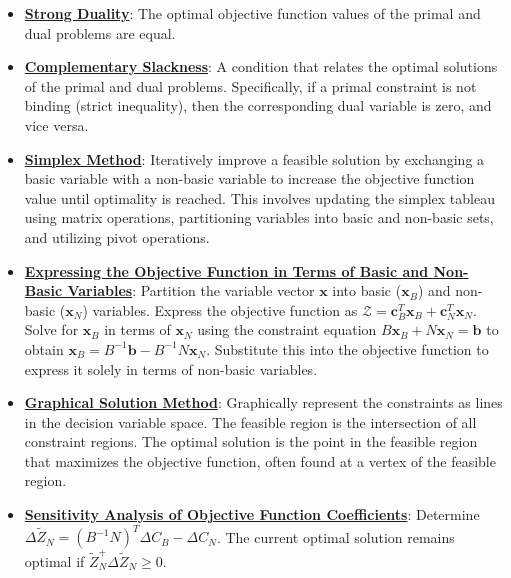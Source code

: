 \documentclass{article}%
\begin{document}
\begin{itemize}[leftmargin=*]
\item \href{https://www.math.purdue.edu/~yipn/421/2024-09-19-DualityExamples.pdf#page=1}{\textbf{Strong Duality}}: The optimal objective function values of the primal and dual problems are equal. %
\item \href{https://www.math.purdue.edu/~yipn/421/2024-09-19-DualityExamples.pdf#page=1}{\textbf{Complementary Slackness}}: A condition that relates the optimal solutions of the primal and dual problems. Specifically, if a primal constraint is not binding (strict inequality), then the corresponding dual variable is zero, and vice versa. %
\item \href{https://www.math.purdue.edu/~yipn/421/2024-09-24-SimplexMatrix.pdf#page=8}{\textbf{Simplex Method}}: Iteratively improve a feasible solution by exchanging a basic variable with a non-basic variable to increase the objective function value until optimality is reached. This involves updating the simplex tableau using matrix operations, partitioning variables into basic and non-basic sets, and utilizing pivot operations. %
\item \href{https://www.math.purdue.edu/~yipn/421/2024-09-24-SimplexMatrix.pdf#page=4}{\textbf{Expressing the Objective Function in Terms of Basic and Non{-}Basic Variables}}: Partition the variable vector $\mathbf{x}$ into basic ($\mathbf{x}_B$) and non-basic ($\mathbf{x}_N$) variables. Express the objective function as $\mathcal{Z} = \mathbf{c}_B^T \mathbf{x}_B + \mathbf{c}_N^T \mathbf{x}_N$. Solve for $\mathbf{x}_B$ in terms of $\mathbf{x}_N$ using the constraint equation $B\mathbf{x}_B + N\mathbf{x}_N = \mathbf{b}$ to obtain $\mathbf{x}_B = B^{-1}\mathbf{b} - B^{-1}N\mathbf{x}_N$. Substitute this into the objective function to express it solely in terms of non-basic variables. %
\item \href{https://www.math.purdue.edu/~yipn/421/2024-09-24-SimplexMatrix.pdf#page=16}{\textbf{Graphical Solution Method}}: Graphically represent the constraints as lines in the decision variable space. The feasible region is the intersection of all constraint regions. The optimal solution is the point in the feasible region that maximizes the objective function, often found at a vertex of the feasible region. %
\item \href{https://www.math.purdue.edu/~yipn/421/2024-09-26-Sensitivity.pdf#page=7}{\textbf{Sensitivity Analysis of Objective Function Coefficients}}: Determine $\Delta \tilde{Z}_N = (B^{-1}N)^T \Delta C_B - \Delta C_N$. The current optimal solution remains optimal if $\tilde{Z}_N^ + \Delta \tilde{Z}_N \ge 0$.%

\end{itemize}
\end{document}
